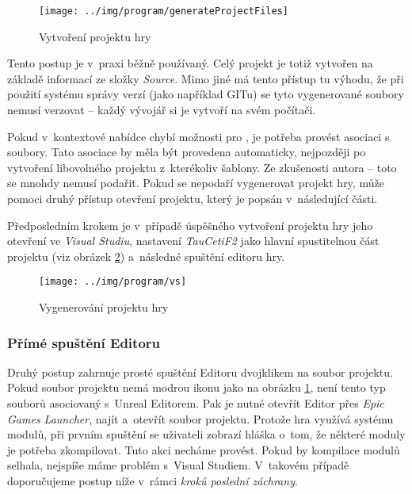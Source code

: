 \begin{figure}[!ht]\centering
\texttt{[image: ../img/program/generateProjectFiles]}

\caption{Vytvoření projektu hry}
\label{fig:generateProjectFiles}

\end{figure}
\FloatBarrier

Tento postup je v~praxi běžně používaný.  Celý projekt je totiž vytvořen na základě informací ze složky \textit{Source}. Mimo jiné má tento přístup tu výhodu, že při použití systému správy verzí (jako například GITu) se tyto vygenerované soubory nemusí verzovat -- každý vývojář si je vytvoří na svém počítači.

Pokud v~kontextové nabídce chybí možnosti pro \UE{}, je potřeba provést asociaci s~ soubory. Tato asociace by měla být provedena automaticky, nejpozději po vytvoření libovolného \CPP{} projektu z~kterékoliv šablony. Ze zkušenosti autora -- toto se mnohdy nemusí podařit. Pokud se nepodaří vygenerovat projekt hry, může pomoci druhý přístup otevření projektu, který je popsán v~následující části.

Předposledním krokem je v~případě úspěšného vytvoření projektu hry jeho otevření ve \textit{Visual Studiu}, nastavení \textit{TauCetiF2} jako hlavní spustitelnou část projektu (viz obrázek \ref{fig:vs}) a~následné spuštění  editoru hry.


\begin{figure}[!ht]\centering
\texttt{[image: ../img/program/vs]}

\caption{Vygenerování projektu hry}
\label{fig:vs}

\end{figure}

\FloatBarrier



\subsubsection{Přímé spuštění Editoru}
Druhý postup zahrnuje prosté spuštění Editoru dvojklikem na soubor projektu. Pokud soubor projektu nemá modrou ikonu jako na obrázku \ref{fig:generateProjectFiles}, není tento typ souborů asociovaný s~Unreal Editorem. Pak je nutné otevřít Editor přes \textit{Epic Games Launcher}, najít a~otevřít soubor projektu. Protože hra využívá systému modulů, při prvním spuštění se uživateli zobrazí hláška o~tom, že některé moduly je potřeba zkompilovat. Tuto akci necháme provést. Pokud by kompilace modulů selhala, nejspíše máme problém s~Visual Studiem. V~takovém případě doporučujeme postup níže v~rámci \textit{kroků poslední záchrany}.

